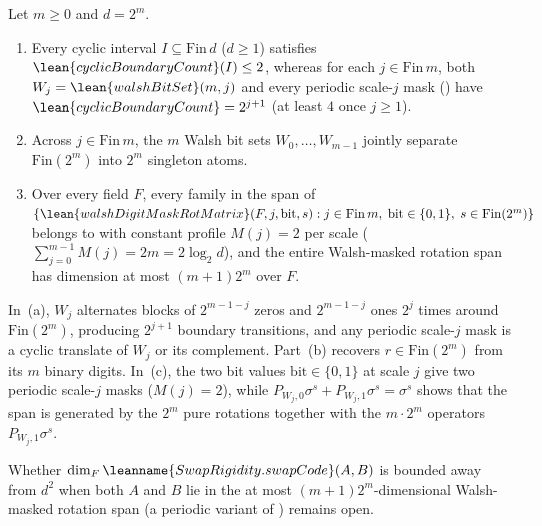 \begin{proposition}\label{prop:walsh-dichotomy}
Let $m \ge 0$ and $d = 2^m$.
\begin{enumerate}[label=(\alph*)]
\item Every cyclic interval $I \subseteq \mathrm{Fin}\,d$ ($d \ge 1$) satisfies
  $\lean{cyclicBoundaryCount}(I) \le 2$, whereas for each $j \in \mathrm{Fin}\,m$, both
  $W_j = \lean{walshBitSet}(m, j)$ and every periodic scale-$j$ mask
  () have $\lean{cyclicBoundaryCount} = 2^{j+1}$ (at least $4$ once
  $j \ge 1$).
\item Across $j \in \mathrm{Fin}\,m$, the $m$ Walsh bit sets $W_0, \dots, W_{m-1}$ jointly separate
  $\mathrm{Fin}(2^m)$ into $2^m$ singleton atoms.
\item Over every field $F$, every family in the span of
  $\{\lean{walshDigitMaskRotMatrix}(F, j, \mathrm{bit}, s) : j \in \mathrm{Fin}\,m,\;
  \mathrm{bit} \in \{0,1\},\; s \in \mathrm{Fin}(2^m)\}$ belongs to
   with constant profile $M(j) = 2$ per scale
  ($\sum_{j=0}^{m-1} M(j) = 2m = 2\log_2 d$), and the entire Walsh-masked rotation span has dimension
  at most $(m + 1)2^m$ over $F$.
\end{enumerate}
\end{proposition}
\begin{outline}
In~(a), $W_j$ alternates blocks of $2^{m-1-j}$ zeros and $2^{m-1-j}$ ones $2^j$ times around
$\mathrm{Fin}(2^m)$, producing $2^{j+1}$ boundary transitions, and any periodic scale-$j$ mask is a
cyclic translate of $W_j$ or its complement. Part~(b) recovers $r \in \mathrm{Fin}(2^m)$ from its
$m$ binary digits. In~(c), the two bit values $\mathrm{bit} \in \{0,1\}$ at scale $j$ give two
periodic scale-$j$ masks ($M(j) = 2$), while $P_{W_j, 0}\sigma^s + P_{W_j, 1}\sigma^s = \sigma^s$
shows that the span is generated by the $2^m$ pure rotations together with the $m \cdot 2^m$
operators $P_{W_j, 1}\sigma^s$.
\end{outline}

Whether $\dim_F \leanname{SwapRigidity.swapCode}(A, B)$ is bounded away from $d^2$ when both $A$ and
$B$ lie in the at most $(m+1)2^m$-dimensional Walsh-masked rotation span (a periodic variant of
\cite[Problem~9.3]{SeventeenthPaper2026}) remains open.
